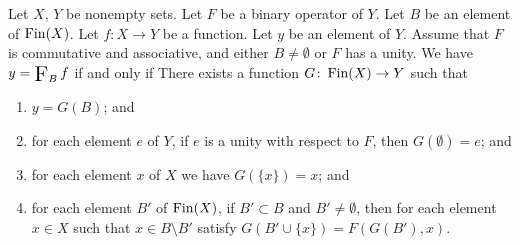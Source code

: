 \documentclass{article}
\begin{document}
\begin{thm}
\item\label{setwiseo:16} Let $X$, $Y$ be nonempty sets.
  Let $F$ be a binary operator of $Y$.
  Let $B$ be an element of $\operatorname{Fin}(X)$.
  Let $f\colon X\to Y$ be a function.
  Let $y$ be an element of $Y$.
  Assume that $F$ is commutative and associative, and either $B\neq\emptyset$
or $F$ has a unity.
  We have $y=\iteratedBinop{F}_{B}f$ if and only if There exists a function $G\colon\operatorname{Fin}(X)\to Y$ such that
\begin{enumerate}[label=(\roman*)]
\item $y=G(B)$; and
\item for each element $e$ of $Y$, if $e$ is a unity with respect to
  $F$, then $G(\emptyset)=e$; and
\item for each element $x$ of $X$ we have $G(\{x\})=x$; and
\item for each element $B'$ of $\operatorname{Fin}(X)$, if $B'\subset B$ and $B'\neq\emptyset$,
  then for each element $x\in X$ such that $x\in B\setminus B'$ satisfy $G(B'\cup\{x\})=F(G(B'),x)$.
\end{enumerate}
\end{thm}
\end{document}
